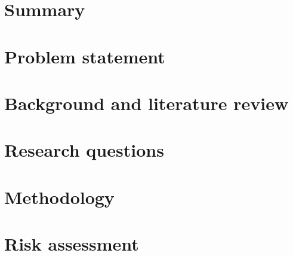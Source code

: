 \section{Summary}
\section{Problem statement}
\section{Background and literature review}
\section{Research questions}
\section{Methodology}
\section{Risk assessment}
